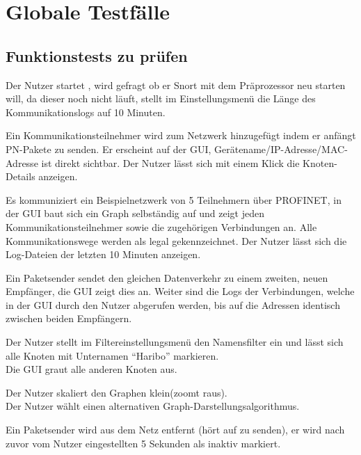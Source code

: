 \chapter{Globale Testfälle}

\section{Funktionstests zu prüfen}

\begin{description}[style=multiline, leftmargin=4cm, labelwidth=4cm]
  \item[\namedlabel{start}{Programm starten}] Der Nutzer startet \programname, wird gefragt ob er Snort mit dem Präprozessor neu starten will, da dieser noch nicht läuft, stellt im Einstellungsmenü die Länge des Kommunikationslogs auf 10 Minuten.
  \item[\namedlabel{addNetNode}{Kommunikationsteilnehmer hinzufügen}] Ein Kommunikationsteilnehmer wird zum Netzwerk hinzugefügt indem er anfängt PN-Pakete zu senden. Er erscheint auf der GUI, Gerätename/IP-Adresse/MAC-Adresse ist direkt sichtbar. Der Nutzer lässt sich mit einem Klick die Knoten-Details anzeigen.
  \item[\namedlabel{normalWatch}{Normale Netzwerküberwachung}] Es kommuniziert ein Beispielnetzwerk von 5 Teilnehmern über PROFINET, in der GUI baut sich ein Graph selbständig auf und zeigt jeden Kommunikationsteilnehmer sowie die zugehörigen Verbindungen an. Alle Kommunikationswege werden als legal gekennzeichnet. Der Nutzer lässt sich die Log-Dateien der letzten 10 Minuten anzeigen.
  \item[\namedlabel{guiDisplay}{Korrekte GUI Darstellung}] Ein Paketsender sendet den gleichen Datenverkehr zu einem zweiten, neuen Empfänger, die GUI zeigt dies an. Weiter sind die Logs der Verbindungen, welche in der GUI durch den Nutzer abgerufen werden, bis auf die Adressen identisch zwischen beiden Empfängern.
  \item[\namedlabel{filter}{Filter anwenden}] Der Nutzer stellt im Filtereinstellungsmenü den Namensfilter ein und lässt sich alle Knoten mit Unternamen “Haribo” markieren. \\Die GUI graut alle anderen Knoten aus.
  \item[\namedlabel{guiChanging}{Graph verändern}] Der Nutzer skaliert den Graphen klein(zoomt raus). \\Der Nutzer wählt einen alternativen Graph-Darstellungsalgorithmus.
  \item[\namedlabel{inactive}{Netzteilnehmer wird inaktiv}] Ein Paketsender wird aus dem Netz entfernt (hört auf zu senden), er wird nach zuvor vom Nutzer eingestellten 5 Sekunden als inaktiv markiert.

\end{description}
